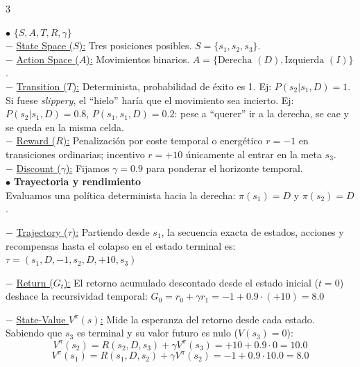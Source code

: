 \documentclass[8pt,a4paper,landscape,fleqn]{extarticle}
\begin{document}
\begin{multicols*}{3}
\begin{center}
\end{center}
\vspace{-2mm}
$\bullet$ \textbf{$\{S, A, T, R, \gamma\}$}\\
$-$ \underline{State Space ($S$):} Tres posiciones posibles. $S = \{s_1, s_2, s_3\}$.\\
$-$ \underline{Action Space ($A$):} Movimientos binarios. $A = \{\text{Derecha } (D), \text{Izquierda } (I)\}$.\\
$-$ \underline{Transition ($T$):} Determinista, probabilidad de éxito es 1. Ej: $P(s_2 | s_1, D) = 1$.\\ Si fuese \textit{slippery}, el ``hielo'' haría que el movimiento sea incierto. Ej: $P(s_2| s_1, D)= 0.8$, $P(s_1, s_1,D )=0.2$: pese a ``querer'' ir a la derecha, se cae y se queda en la misma celda.\\
$-$ \underline{Reward ($R$):} Penalización por coste temporal o energético $r = -1$ en transiciones ordinarias; incentivo $r = +10$ únicamente al entrar en la meta $s_3$.\\
$-$ \underline{Discount ($\gamma$):} Fijamos $\gamma = 0.9$ para ponderar el horizonte temporal.\\
$\bullet$ \textbf{Trayectoria y rendimiento}\\
Evaluamos una política determinista hacia la derecha: $\pi(s_1) = D$ y $\pi(s_2) = D$.

$-$ \underline{Trajectory ($\tau$):} Partiendo desde $s_1$, la secuencia exacta de estados, acciones y recompensas hasta el colapso en el estado terminal es:
$ \tau = (s_1, D, -1, s_2, D, +10, s_3) $

$-$ \underline{Return ($G_t$):} El retorno acumulado descontado desde el estado inicial ($t=0$) deshace la recursividad temporal:
$ G_0 = r_0 + \gamma r_1 = -1 + 0.9 \cdot (+10) = 8.0 $

$-$ \underline{State-Value $V^\pi(s)$:} Mide la esperanza del retorno desde cada estado. Sabiendo que $s_3$ es terminal y su valor futuro es nulo ($V(s_3)=0$):
$$ V^\pi(s_2) = R(s_2, D, s_3) + \gamma V^\pi(s_3) = +10 + 0.9 \cdot 0 = 10.0 $$
$$ V^\pi(s_1) = R(s_1, D, s_2) + \gamma V^\pi(s_2) = -1 + 0.9 \cdot 10.0 = 8.0 $$


\end{multicols*}
\end{document}
